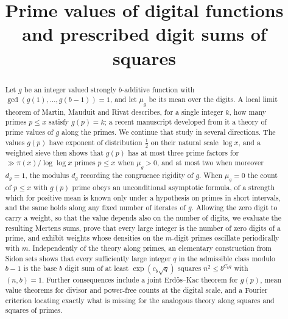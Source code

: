 \documentclass[11pt,reqno]{amsart}
\theoremstyle{plain}
\theoremstyle{definition}
\begin{document}
\title[Prime values of digital functions]{Prime values of digital functions and prescribed digit sums of squares}


\date{}


\begin{abstract}
Let $g$ be an integer valued strongly $b$-additive function with $\gcd(g(1),\dots,g(b-1))=1$, and let $\mu_g$ be its mean over the digits. A local limit theorem of Martin, Mauduit and Rivat describes, for a single integer $k$, how many primes $p\le x$ satisfy $g(p)=k$; a recent manuscript developed from it a theory of prime values of $g$ along the primes. We continue that study in several directions. The values $g(p)$ have exponent of distribution $\tfrac12$ on their natural scale $\log x$, and a weighted sieve then shows that $g(p)$ has at most three prime factors for $\gg\pi(x)/\log\log x$ primes $p\le x$ when $\mu_g>0$, and at most two when moreover $d_g=1$, the modulus $d_g$ recording the congruence rigidity of $g$. When $\mu_g=0$ the count of $p\le x$ with $g(p)$ prime obeys an unconditional asymptotic formula, of a strength which for positive mean is known only under a hypothesis on primes in short intervals, and the same holds along any fixed number of iterates of $g$. Allowing the zero digit to carry a weight, so that the value depends also on the number of digits, we evaluate the resulting Mertens sums, prove that every large integer is the number of zero digits of a prime, and exhibit weights whose densities on the $m$-digit primes oscillate periodically with $m$. Independently of the theory along primes, an elementary construction from Sidon sets shows that every sufficiently large integer $q$ in the admissible class modulo $b-1$ is the base $b$ digit sum of at least $\exp(c_b\sqrt q)$ squares $n^2\le b^{C_bq}$ with $(n,b)=1$. Further consequences include a joint Erd\H{o}s--Kac theorem for $g(p)$, mean value theorems for divisor and power-free counts at the digital scale, and a Fourier criterion locating exactly what is missing for the analogous theory along squares and squares of primes.
\end{abstract}

\maketitle
\end{document}
